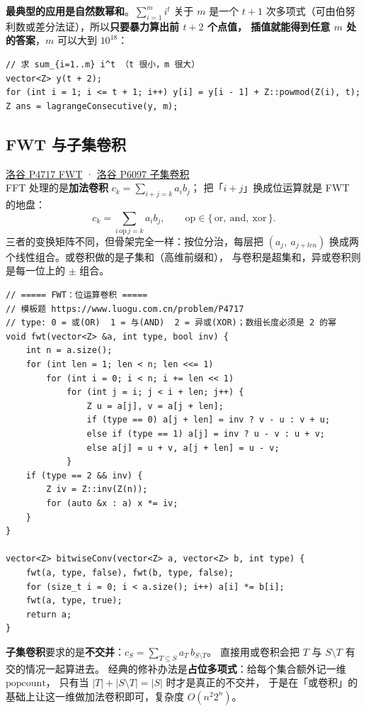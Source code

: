 		\textbf{最典型的应用是自然数幂和}。$\sum_{i=1}^{m} i^t$ 关于 $m$ 是一个
		$t+1$ 次多项式（可由伯努利数或差分法证），所以\textbf{只要暴力算出前 $t+2$ 个点值，
		插值就能得到任意 $m$ 处的答案}，$m$ 可以大到 $10^{18}$：

		\begin{verbatim}
// 求 sum_{i=1..m} i^t （t 很小，m 很大）
vector<Z> y(t + 2);
for (int i = 1; i <= t + 1; i++) y[i] = y[i - 1] + Z::powmod(Z(i), t);
Z ans = lagrangeConsecutive(y, m);
		\end{verbatim}

		\subsection{FWT 与子集卷积}

		\href{https://www.luogu.com.cn/problem/P4717}{洛谷 P4717 FWT} ·
		\href{https://www.luogu.com.cn/problem/P6097}{洛谷 P6097 子集卷积} \\

		FFT 处理的是\textbf{加法卷积} $c_k = \sum_{i+j=k} a_i b_j$；
		把「$i+j$」换成位运算就是 FWT 的地盘：
		$$c_k = \sum_{i \,\mathrm{op}\, j = k} a_i b_j, \qquad
		  \mathrm{op} \in \{\,\mathrm{or},\ \mathrm{and},\ \mathrm{xor}\,\}.$$
		三者的变换矩阵不同，但骨架完全一样：按位分治，每层把
		$(a_j,\ a_{j+len})$ 换成两个线性组合。或卷积做的是子集和（高维前缀和），
		与卷积是超集和，异或卷积则是每一位上的 $\pm$ 组合。

		\begin{verbatim}
// ===== FWT：位运算卷积 =====
// 模板题 https://www.luogu.com.cn/problem/P4717
// type: 0 = 或(OR)  1 = 与(AND)  2 = 异或(XOR)；数组长度必须是 2 的幂
void fwt(vector<Z> &a, int type, bool inv) {
    int n = a.size();
    for (int len = 1; len < n; len <<= 1)
        for (int i = 0; i < n; i += len << 1)
            for (int j = i; j < i + len; j++) {
                Z u = a[j], v = a[j + len];
                if (type == 0) a[j + len] = inv ? v - u : v + u;
                else if (type == 1) a[j] = inv ? u - v : u + v;
                else a[j] = u + v, a[j + len] = u - v;
            }
    if (type == 2 && inv) {
        Z iv = Z::inv(Z(n));
        for (auto &x : a) x *= iv;
    }
}

vector<Z> bitwiseConv(vector<Z> a, vector<Z> b, int type) {
    fwt(a, type, false), fwt(b, type, false);
    for (size_t i = 0; i < a.size(); i++) a[i] *= b[i];
    fwt(a, type, true);
    return a;
}
		\end{verbatim}

		\textbf{子集卷积}要求的是\textbf{不交并}：$c_S = \sum_{T \subseteq S} a_T\, b_{S\setminus T}$。
		直接用或卷积会把 $T$ 与 $S\setminus T$ 有交的情况一起算进去。
		经典的修补办法是\textbf{占位多项式}：给每个集合额外记一维 $\mathrm{popcount}$，
		只有当 $|T| + |S \setminus T| = |S|$ 时才是真正的不交并，
		于是在「或卷积」的基础上让这一维做加法卷积即可，复杂度 $O(n^2 2^n)$。

